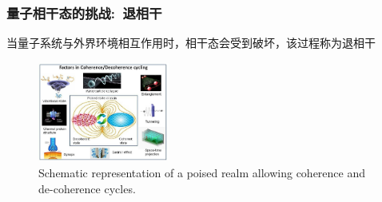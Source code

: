 \begin{frame}
    \frametitle{量子相干态的挑战:~退相干}
        当量子系统与外界环境相互作用时，相干态会受到破坏，该过程称为退相干
            \begin{figure}
        \centering
                \includegraphics[height=1.3in, width=1.7in, viewport=0 0 650 470,clip]{Figures/Schematic-representation-of-a-poised-realm-allowing-coherence-and-de-coherence-cycles.jpeg}
		\caption{\tiny{\textrm{Schematic representation of a poised realm allowing coherence and de-coherence cycles.}}}
		\label{Fig:Schematic-representation-of-a-poised-realm-allowing-coherence-and-de-coherence-cycles}
            \end{figure}
	    \vskip -10pt
	{\fontsize{9.5pt}{5.2pt}\selectfont{\textcolor{magenta}{退相干是实现大规模量子计算和长距离量子通信的主要障碍}}}
{\fontsize{8.5pt}{5.2pt}}
\end{frame}

